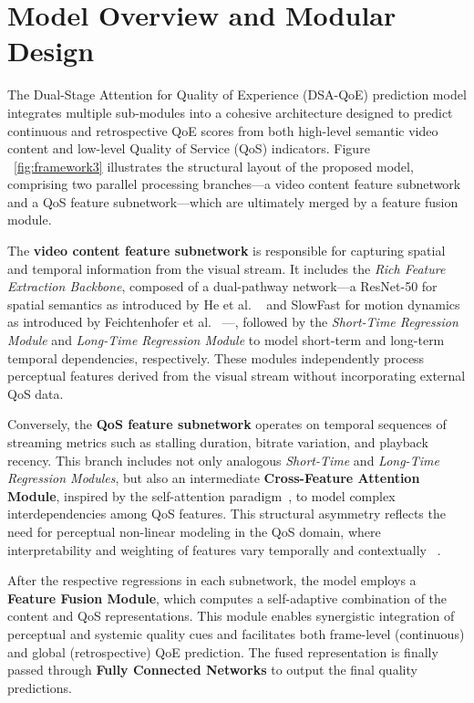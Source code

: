 \section{Model Overview and Modular Design}

The Dual-Stage Attention for Quality of Experience (DSA-QoE) prediction model integrates multiple sub-modules into a cohesive architecture designed to predict continuous and retrospective QoE scores from both high-level semantic video content and low-level Quality of Service (QoS) indicators. Figure ~\ref{fig:framework3} illustrates the structural layout of the proposed model, comprising two parallel processing branches---a video content feature subnetwork and a QoS feature subnetwork---which are ultimately merged by a feature fusion module.

The \textbf{video content feature subnetwork} is responsible for capturing spatial and temporal information from the visual stream. It includes the \textit{Rich Feature Extraction Backbone}, composed of a dual-pathway network---a ResNet-50 for spatial semantics as introduced by He et al. ~\cite{he2016deep} and SlowFast for motion dynamics as introduced by Feichtenhofer et al. ~\cite{feichtenhofer2019slowfast}---, followed by the \textit{Short-Time Regression Module} and \textit{Long-Time Regression Module} to model short-term and long-term temporal dependencies, respectively. These modules independently process perceptual features derived from the visual stream without incorporating external QoS data.

Conversely, the \textbf{QoS feature subnetwork} operates on temporal sequences of streaming metrics such as stalling duration, bitrate variation, and playback recency. This branch includes not only analogous \textit{Short-Time} and \textit{Long-Time Regression Modules}, but also an intermediate \textbf{Cross-Feature Attention Module}, inspired by the self-attention paradigm~\cite{vaswani2017attention}, to model complex interdependencies among QoS features. This structural asymmetry reflects the need for perceptual non-linear modeling in the QoS domain, where interpretability and weighting of features vary temporally and contextually ~\cite{jia2024continuous}.

After the respective regressions in each subnetwork, the model employs a \textbf{Feature Fusion Module}, which computes a self-adaptive combination of the content and QoS representations. This module enables synergistic integration of perceptual and systemic quality cues and facilitates both frame-level (continuous) and global (retrospective) QoE prediction. The fused representation is finally passed through \textbf{Fully Connected Networks} to output the final quality predictions.

